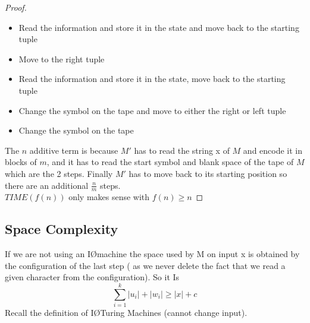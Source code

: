 \begin{theorem}
\begin{proof}
\begin{itemize}
            \item Read the information and store it in the state and move back to the starting tuple
            \item Move to the right tuple 
            \item Read the information and store it in the state, move back to the starting tuple
            \item Change the symbol on the tape and move to either the right or left tuple
            \item Change the symbol on the tape 
        \end{itemize}
        The $n$ additive term is because $M'$ has to read the string x of $M$ and encode it in blocks of $m$, and it has to read the start symbol and blank space of the tape of $M$ which are the 2 steps. Finally $M'$ has to move back to its starting position so there are an additional $\frac{n}{m}$ steps.\\
        $TIME(f(n))$ only makes sense with $f(n) \geq n$
    \end{proof}
\end{theorem}

\subsection*{Space Complexity}
 If we are not using an I\O machine the space used by M on input x is obtained by the configuration of the last step ( as we never delete the fact that we read a given character from the configuration). So it Is \[ 
    \sum_{i=1}^{k}{|u_i|+|w_i|} \geq |x| +c
\]
Recall the definition of I\O Turing Machines (cannot change input).